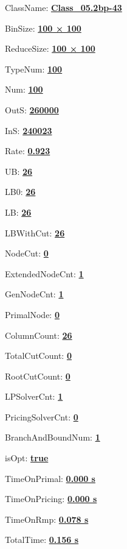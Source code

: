 \documentclass[11pt]{article}
\begin{document}
\pagestyle{empty}


ClassName: \underline{\textbf{Class_05.2bp-43}}
\par
BinSize: \underline{\textbf{100 × 100}}
\par
ReduceSize: \underline{\textbf{100 × 100}}
\par
TypeNum: \underline{\textbf{100}}
\par
Num: \underline{\textbf{100}}
\par
OutS: \underline{\textbf{260000}}
\par
InS: \underline{\textbf{240023}}
\par
Rate: \underline{\textbf{0.923}}
\par
UB: \underline{\textbf{26}}
\par
LB0: \underline{\textbf{26}}
\par
LB: \underline{\textbf{26}}
\par
LBWithCut: \underline{\textbf{26}}
\par
NodeCut: \underline{\textbf{0}}
\par
ExtendedNodeCnt: \underline{\textbf{1}}
\par
GenNodeCnt: \underline{\textbf{1}}
\par
PrimalNode: \underline{\textbf{0}}
\par
ColumnCount: \underline{\textbf{26}}
\par
TotalCutCount: \underline{\textbf{0}}
\par
RootCutCount: \underline{\textbf{0}}
\par
LPSolverCnt: \underline{\textbf{1}}
\par
PricingSolverCnt: \underline{\textbf{0}}
\par
BranchAndBoundNum: \underline{\textbf{1}}
\par
isOpt: \underline{\textbf{true}}
\par
TimeOnPrimal: \underline{\textbf{0.000 s}}
\par
TimeOnPricing: \underline{\textbf{0.000 s}}
\par
TimeOnRmp: \underline{\textbf{0.078 s}}
\par
TotalTime: \underline{\textbf{0.156 s}}
\par
\newpage


\end{document}
